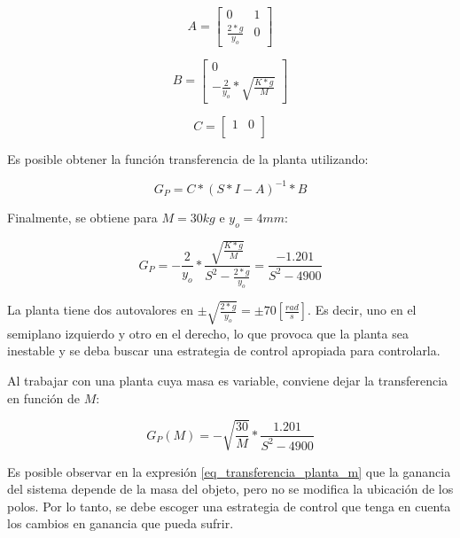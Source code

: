 \begin{equation}
	A=\begin{bmatrix}
		0 & 1\\
		\frac{2*g}{y_{o}} & 0
	\end{bmatrix}
\end{equation}

\begin{equation}
	B=\begin{bmatrix}
		0\\
		-\frac{2}{y_{o}}*\sqrt{\frac{K*g}{M}}
	\end{bmatrix}
\end{equation}

\begin{equation}
	C=\begin{bmatrix}
		1 & 0\\
	\end{bmatrix}
\end{equation}

\noindent Es posible obtener la función transferencia de la planta utilizando:

\begin{equation}\label{eq_transferencia_planta}
	G_{P}=C*(S*I-A)^{-1}*B
\end{equation}

\noindent Finalmente, se obtiene para $M=30kg$ e $y_{o}=4mm$:

\begin{equation}
	G_{P}=-\frac{2}{y_{o}}*\frac{\sqrt{\frac{K*g}{M}}}{S^2-\frac{2*g}{y_{o}}}=\frac{-1.201}{S^{2}-4900}
\end{equation}

\noindent La planta tiene dos autovalores en $\pm\sqrt{\frac{2*g}{y_{o}}}=\pm70[\frac{rad}{s}]$. Es decir, uno en el semiplano izquierdo y otro en el derecho, lo que provoca que la planta sea inestable y se deba buscar una estrategia de control apropiada para controlarla.

\noindent Al trabajar con una planta cuya masa es variable, conviene dejar la transferencia en función de $M$:

\begin{equation} \label{eq_transferencia_planta_m}
		G_{P}(M)=-\sqrt{\frac{30}{M}}*\frac{1.201}{S^{2}-4900}
\end{equation}

\noindent Es posible observar en la expresión \ref{eq_transferencia_planta_m} que la ganancia del sistema depende de la masa del objeto, pero no se modifica la ubicación de los polos. Por lo tanto, se debe escoger una estrategia de control que tenga en cuenta los cambios en ganancia que pueda sufrir.
